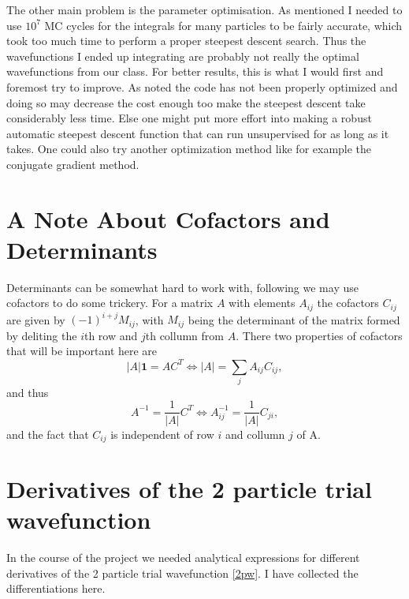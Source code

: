 \documentclass[a4paper,English,10pt]{article}
\newcommand{\bb}[1]{\boldsymbol{#1}}
\newcommand{\id}{\bb{1}}
\newcommand{\be}{\begin{equation}}
\newcommand{\ee}{\end{equation}}
\newcommand{\f}{\frac}
\begin{document}
The other main problem is the parameter optimisation. As mentioned I needed to use $10^7$
MC cycles for the integrals for many particles to be fairly accurate, which took too much time to perform a proper steepest descent search.
Thus the wavefunctions I ended up integrating are probably not really the optimal wavefunctions from our class. For better results, this is what I would first and foremost
try to improve. As noted the code has not been properly optimized and doing so may decrease the cost enough too make the steepest descent take considerably less time.
Else one might put more effort into making a robust automatic steepest descent function that can run unsupervised for as long as it takes. One could also try another optimization
method like for example the conjugate gradient method.


\appendix
\section{A Note About Cofactors and Determinants}\label{cofac}
Determinants can be somewhat hard to work with, following \cite{mortenbok} we may use cofactors to do some trickery.
For a matrix $A$ with elements $A_{ij}$ the cofactors $C_{ij}$ are given by $(-1)^{i+j} M_{ij}$, with $M_{ij}$ being the determinant of the matrix formed by deliting the $i$th
row and $j$th collumn from $A$. There two properties of cofactors that will be important here are
\be
|A|\id = A C^T \Leftrightarrow |A| = \sum_jA_{ij}C_{ij},
\ee
and thus
\be
A^{-1} = \f{1}{|A|}C^T \Leftrightarrow A^{-1}_{ij} = \f{1}{|A|}C_{ji},
\ee
and the fact that $C_{ij}$ is independent of row $i$ and collumn $j$ of A.





\section{Derivatives of the 2 particle trial wavefunction}
In the course of the project we needed analytical expressions for different derivatives of the 2 particle trial wavefunction \ref{2pw}. I have collected
the differentiations here.
\end{document}
